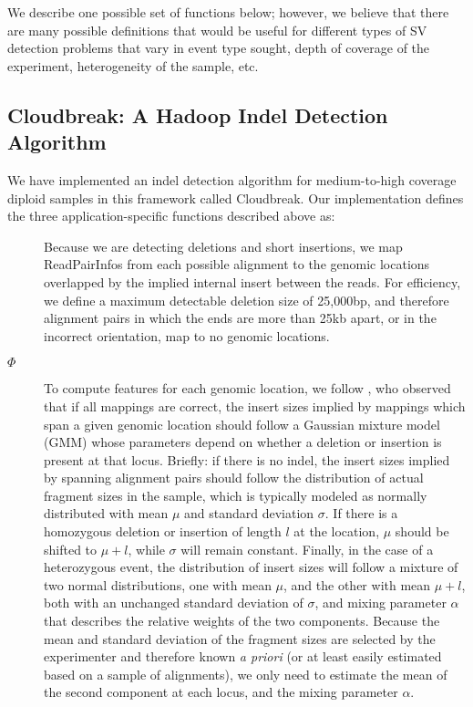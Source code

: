 \documentclass[11pt]{article}
\begin{document}
We describe one possible set of functions below; however, we believe that there are many possible definitions that would be useful for different types of SV detection problems that vary in event type sought, depth of coverage of the experiment, heterogeneity of the sample, etc.

\subsection{Cloudbreak: A Hadoop Indel Detection Algorithm}

We have implemented an indel detection algorithm for medium-to-high coverage diploid samples in this framework called Cloudbreak. Our implementation defines the three application-specific functions described above as:
\begin{description}
\item[] Because we are detecting deletions and short insertions, we map ReadPairInfos from each possible alignment to the genomic locations overlapped by the implied internal insert between the reads. For efficiency, we define a maximum detectable deletion size of 25,000bp, and therefore alignment pairs in which the ends are more than 25kb apart, or in the incorrect orientation, map to no genomic locations.
\item[$\Phi$] To compute features for each genomic location, we follow \textcite{Lee:2009da}, who observed that if all mappings are correct, the insert sizes implied by mappings which span a given genomic location should follow a Gaussian mixture model (GMM) whose parameters depend on whether a deletion or insertion is present at that locus. Briefly: if there is no indel, the insert sizes implied by spanning alignment pairs should follow the distribution of actual fragment sizes in the sample, which is typically modeled as normally distributed with mean $\mu$ and standard deviation $\sigma$. If there is a homozygous deletion or insertion of length $l$ at the location, $\mu$ should be shifted to $\mu + l$, while $\sigma$ will remain constant. Finally, in the case of a heterozygous event, the distribution of insert sizes will follow a mixture of two normal distributions, one with mean $\mu$, and the other with mean $\mu + l$, both with an unchanged standard deviation of $\sigma$, and mixing parameter $\alpha$ that describes the relative weights of the two components. Because the mean and standard deviation of the fragment sizes are selected by the experimenter and therefore known \emph{a priori} (or at least easily estimated based on a sample of alignments), we only need to estimate the mean of the second component at each locus, and the mixing parameter $\alpha$.


\end{description}
\end{document}
